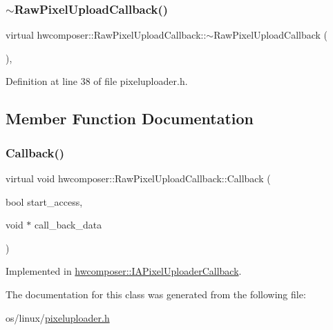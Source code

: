 \subsubsection{\texorpdfstring{$\sim$\+Raw\+Pixel\+Upload\+Callback()}{~RawPixelUploadCallback()}}
{\footnotesize\ttfamily virtual hwcomposer\+::\+Raw\+Pixel\+Upload\+Callback\+::$\sim$\+Raw\+Pixel\+Upload\+Callback (\begin{DoxyParamCaption}{ }\end{DoxyParamCaption})\hspace{0.3cm}{\ttfamily [inline]}, {\ttfamily [virtual]}}



Definition at line 38 of file pixeluploader.\+h.


\begin{DoxyCode}{0}
\end{DoxyCode}


\subsection{Member Function Documentation}
\mbox{\label{classhwcomposer_1_1RawPixelUploadCallback_a37aa7f3e3a5b5e9b43d1a11f56806979}} 
\subsubsection{\texorpdfstring{Callback()}{Callback()}}
{\footnotesize\ttfamily virtual void hwcomposer\+::\+Raw\+Pixel\+Upload\+Callback\+::\+Callback (\begin{DoxyParamCaption}\item[{bool}]{start\+\_\+access,  }\item[{void $\ast$}]{call\+\_\+back\+\_\+data }\end{DoxyParamCaption})\hspace{0.3cm}{\ttfamily [pure virtual]}}



Implemented in \mbox{\hyperlink{classhwcomposer_1_1IAPixelUploaderCallback_aadcf6756b46e8d237ac52a87199fc4eb}{hwcomposer\+::\+I\+A\+Pixel\+Uploader\+Callback}}.



The documentation for this class was generated from the following file\+:\begin{DoxyCompactItemize}
\item 
os/linux/\mbox{\hyperlink{pixeluploader_8h}{pixeluploader.\+h}}\end{DoxyCompactItemize}
